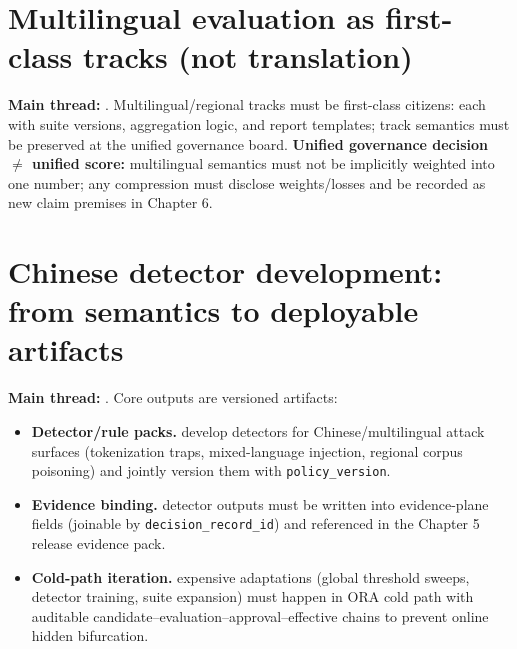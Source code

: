 \documentclass[11pt,a4paper]{report}
\begin{document}
\section{Multilingual evaluation as first-class tracks (not translation)}
\textbf{Main thread:} \EvalFramework{}. Multilingual/regional tracks must be first-class citizens: each with suite versions, aggregation logic, and report templates; track semantics must be preserved at the unified governance board. \textbf{Unified governance decision \(\neq\) unified score:} multilingual semantics must not be implicitly weighted into one number; any compression must disclose weights/losses and be recorded as new claim premises in Chapter 6.

\section{Chinese detector development: from semantics to deployable artifacts}
\textbf{Main thread:} \ControlPlane{}. Core outputs are versioned artifacts:
\begin{itemize}
  \item \textbf{Detector/rule packs.} develop detectors for Chinese/multilingual attack surfaces (tokenization traps, mixed-language injection, regional corpus poisoning) and jointly version them with \texttt{policy\_version}.
  \item \textbf{Evidence binding.} detector outputs must be written into evidence-plane fields (joinable by \texttt{decision\_record\_id}) and referenced in the Chapter 5 release evidence pack.
  \item \textbf{Cold-path iteration.} expensive adaptations (global threshold sweeps, detector training, suite expansion) must happen in ORA cold path with auditable candidate–evaluation–approval–effective chains to prevent online hidden bifurcation.
\end{itemize}

\end{document}
